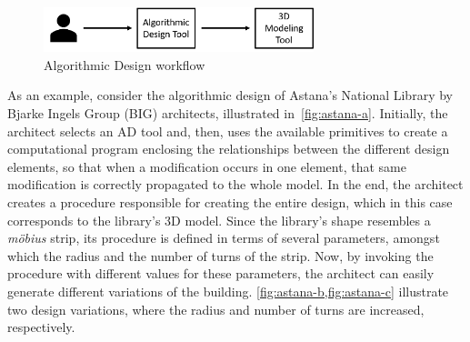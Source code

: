 \begin{figure}[htbp]
\centering
\includegraphics[width=0.70\textwidth]{./Images/Introduction/AlgorithmicArchitecturalDesign.png}
\caption[General view of the Algorithmic Design Approach]{Algorithmic Design workflow}
\label{fig:algorithmicdesign}
\end{figure}
	
	As an example, consider the algorithmic design of Astana's National Library by Bjarke Ingels Group (BIG) architects, illustrated in~\cref{fig:astana-a}. Initially, the architect selects an \ac{AD} tool and, then, uses the available primitives to create a computational program enclosing the relationships between the different design elements, so that when a modification occurs in one element, that same modification is correctly propagated to the whole model. In the end, the architect creates a procedure responsible for creating the entire design, which in this case corresponds to the library's 3D model. Since the library's shape resembles a \textit{möbius} strip, its procedure is defined in terms of several parameters, amongst which the radius and the number of turns of the strip. Now, by invoking the procedure with different values for these parameters, the architect can easily generate different variations of the building. \cref{fig:astana-b,fig:astana-c} illustrate two design variations, where the radius and number of turns are increased, respectively. 
	
